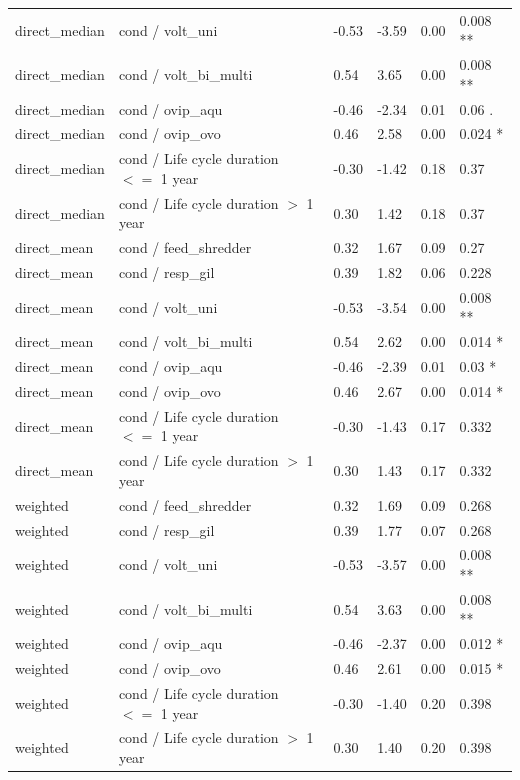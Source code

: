 \documentclass[12pt]{article}
\begin{document}
\begin{longtable}[H]{m{2.6cm}|m{7.3cm}|m{1cm}|m{1.4cm}|m{1.5cm}|m{1.5cm}}
      direct\_median & cond / volt\_uni & -0.53 & -3.59 & 0.00 & 0.008 ** \\ 
      direct\_median & cond / volt\_bi\_multi & 0.54 & 3.65 & 0.00 & 0.008 ** \\ 
      direct\_median & cond / ovip\_aqu & -0.46 & -2.34 & 0.01 & 0.06 . \\ 
      direct\_median & cond / ovip\_ovo & 0.46 & 2.58 & 0.00 & 0.024 * \\ 
      direct\_median & cond / Life cycle duration $<=$ 1 year & -0.30 & -1.42 & 0.18 & 0.37 \\ 
      direct\_median & cond / Life cycle duration $>$ 1 year & 0.30 & 1.42 & 0.18 & 0.37 \\
      \midrule 
      direct\_mean & cond / feed\_shredder & 0.32 & 1.67 & 0.09 & 0.27 \\ 
      direct\_mean & cond / resp\_gil & 0.39 & 1.82 & 0.06 & 0.228 \\ 
      direct\_mean & cond / volt\_uni & -0.53 & -3.54 & 0.00 & 0.008 ** \\ 
      direct\_mean & cond / volt\_bi\_multi & 0.54 & 2.62 & 0.00 & 0.014 * \\ 
      direct\_mean & cond / ovip\_aqu & -0.46 & -2.39 & 0.01 & 0.03 * \\ 
      direct\_mean & cond / ovip\_ovo & 0.46 & 2.67 & 0.00 & 0.014 * \\ 
      direct\_mean & cond / Life cycle duration $<=$ 1 year & -0.30 & -1.43 & 0.17 & 0.332 \\ 
      direct\_mean & cond / Life cycle duration $>$ 1 year & 0.30 & 1.43 & 0.17 & 0.332 \\
      \midrule 
      weighted & cond / feed\_shredder & 0.32 & 1.69 & 0.09 & 0.268 \\ 
      weighted & cond / resp\_gil & 0.39 & 1.77 & 0.07 & 0.268 \\ 
      weighted & cond / volt\_uni & -0.53 & -3.57 & 0.00 & 0.008 ** \\ 
      weighted & cond / volt\_bi\_multi & 0.54 & 3.63 & 0.00 & 0.008 ** \\ 
      weighted & cond / ovip\_aqu & -0.46 & -2.37 & 0.00 & 0.012 * \\ 
      weighted & cond / ovip\_ovo & 0.46 & 2.61 & 0.00 & 0.015 * \\ 
      weighted & cond / Life cycle duration $<=$ 1 year & -0.30 & -1.40 & 0.20 & 0.398 \\ 
      weighted & cond / Life cycle duration $>$ 1 year & 0.30 & 1.40 & 0.20 & 0.398 \\

\end{longtable}
\end{document}
